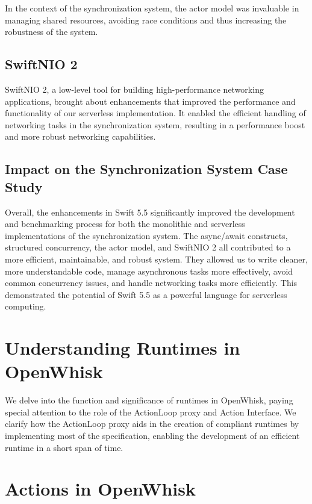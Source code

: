 In the context of the synchronization system, the actor model was invaluable in managing shared resources, avoiding race conditions and thus increasing the robustness of the system.

\subsection{SwiftNIO 2}
\label{subsec:SwiftNIO}

SwiftNIO 2, a low-level tool for building high-performance networking applications, brought about enhancements that improved the performance and functionality of our serverless implementation. It enabled the efficient handling of networking tasks in the synchronization system, resulting in a performance boost and more robust networking capabilities.

\subsection{Impact on the Synchronization System Case Study}
\label{subsec:ImpactCaseStudy}

Overall, the enhancements in Swift 5.5 significantly improved the development and benchmarking process for both the monolithic and serverless implementations of the synchronization system. The async/await constructs, structured concurrency, the actor model, and SwiftNIO 2 all contributed to a more efficient, maintainable, and robust system. They allowed us to write cleaner, more understandable code, manage asynchronous tasks more effectively, avoid common concurrency issues, and handle networking tasks more efficiently. This demonstrated the potential of Swift 5.5 as a powerful language for serverless computing.

\section{Understanding Runtimes in OpenWhisk}
\label{sec:OpenWhiskRuntimes}

We delve into the function and significance of runtimes in OpenWhisk, paying special attention to the role of the ActionLoop proxy and Action Interface. We clarify how the ActionLoop proxy aids in the creation of compliant runtimes by implementing most of the specification, enabling the development of an efficient runtime in a short span of time.
\section{Actions in OpenWhisk}

